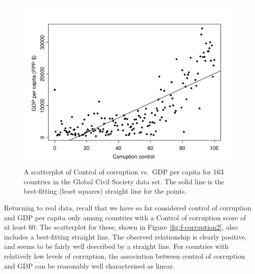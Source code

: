 \documentclass[11pt,a4paper,openany]{book}
\begin{document}
\begin{figure}[htbp]
\centering
\includegraphics[width=13.50000cm]{corruption3.pdf}
\caption{\label{fig:f-corruption3} A scatterplot of Control of corruption
vs.~GDP per capita for 163 countries in the Global Civil Society data
set. The solid line is the best-fitting (least squares) straight line
for the points.}
\end{figure}

Returning to real data, recall that we have so far considered control of
corruption and GDP per capita only among countries with a Control of
corruption score of at least 60. The scatterplot for these, shown in
Figure \ref{fig:f-corruption2}, also includes a best-fitting straight
line. The observed relationship is clearly positive, and seems to be
fairly well described by a straight line. For countries with relatively
low levels of corruption, the association between control of corruption
and GDP can be reasonably well characterised as linear.
\end{document}
